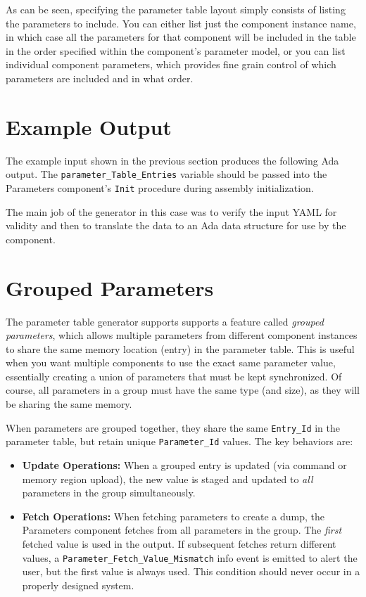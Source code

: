 
As can be seen, specifying the parameter table layout simply consists of listing the parameters to include. You can either list just the component instance name, in which case all the parameters for that component will be included in the table in the order specified within the component's parameter model, or you can list individual component parameters, which provides fine grain control of which parameters are included and in what order.

\section{Example Output}

The example input shown in the previous section produces the following Ada output. The \texttt{parameter\_Table\_Entries} variable should be passed into the Parameters component's \texttt{Init} procedure during assembly initialization.

The main job of the generator in this case was to verify the input YAML for validity and then to translate the data to an Ada data structure for use by the component.


\section{Grouped Parameters}

The parameter table generator supports supports a feature called \textit{grouped parameters}, which allows multiple parameters from different component instances to share the same memory location (entry) in the parameter table. This is useful when you want multiple components to use the exact same parameter value, essentially creating a union of parameters that must be kept synchronized. Of course, all parameters in a group must have the same type (and size), as they will be sharing the same memory.

When parameters are grouped together, they share the same \texttt{Entry\_Id} in the parameter table, but retain unique \texttt{Parameter\_Id} values. The key behaviors are:

\begin{itemize}
\item \textbf{Update Operations:} When a grouped entry is updated (via command or memory region upload), the new value is staged and updated to \textit{all} parameters in the group simultaneously.
\item \textbf{Fetch Operations:} When fetching parameters to create a dump, the Parameters component fetches from all parameters in the group. The \textit{first} fetched value is used in the output. If subsequent fetches return different values, a \texttt{Parameter\_Fetch\_Value\_Mismatch} info event is emitted to alert the user, but the first value is always used. This condition should never occur in a properly designed system.
\end{itemize}

